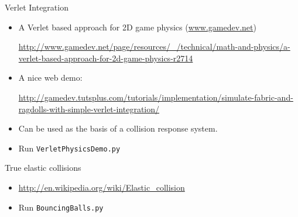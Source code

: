 \documentclass[handout,t,compress]{beamer}
\newcommand{\bframe}[1]{\begin{frame}[fragile]{#1}}
\begin{document}
\bframe{Verlet Integration}
\begin{itemize}
\item A Verlet based approach for 2D game physics (\url{www.gamedev.net})

{\tiny\url{http://www.gamedev.net/page/resources/_/technical/math-and-physics/a-verlet-based-approach-for-2d-game-physics-r2714}}
\item A nice web demo:

{\tiny\url{http://gamedev.tutsplus.com/tutorials/implementation/simulate-fabric-and-ragdolls-with-simple-verlet-integration/}}
\item Can be used as the basis of a collision response system.
\item Run {\tt VerletPhysicsDemo.py}
\end{itemize}
\end{frame}


\bframe{True elastic collisions}
\begin{itemize}
\item \url{http://en.wikipedia.org/wiki/Elastic_collision}
\item Run {\tt BouncingBalls.py}
\end{itemize}

\end{frame}
\end{document}
